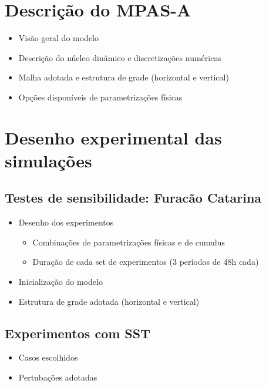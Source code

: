 \section{Descrição do MPAS-A}

\begin{itemize}
    \item Visão geral do modelo
    \item  Descrição do núcleo dinâmico e discretizações numéricas
    \item Malha adotada e estrutura de grade (horizontal e vertical)
    \item Opções disponíveis de parametrizações físicas
\end{itemize}

\section{Desenho experimental das simulações}

\subsection{Testes de sensibilidade: Furacão Catarina}
\begin{itemize}
\item Desenho dos experimentos
\begin{itemize}
    \item Combinações de parametrizações físicas e de cumulus
    \item Duração de cada set de experimentos (3 períodos de 48h cada)
\end{itemize}
\item Inicialização do modelo
\item Estrutura de grade adotada (horizontal e vertical)
\end{itemize}

\subsection{Experimentos com SST}
\begin{itemize}
    \item Casos escolhidos
    \item Pertubações adotadas
\end{itemize}